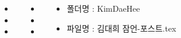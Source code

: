 \documentclass[25pt, a1paper ]{tikzposter}
\begin{document}
\begin{columns}


			{				
			\setlength{\leftmargini}{3em}			
			\setlength{\labelsep}{1em} %

			\begin{LARGE}
			\begin{itemize}
			\item 
			\item 
			\item 

			\end{itemize}
			\end{LARGE}
		}	%


			{				
			\setlength{\leftmargini}{3em}			
			\setlength{\labelsep}{1em} %

			\begin{LARGE}
			\begin{itemize}
			\item 
			\item 
			\item 

			\end{itemize}
			\end{LARGE}
		}	%


			{
				\begin{LARGE}
					\begin{itemize}
					\item 폴더명 : KimDaeHee
					\item 파일명 : 김대희 잠언-포스트.tex
					\end{itemize}
				\end{LARGE}
			}



	\end{columns}
\end{document}
